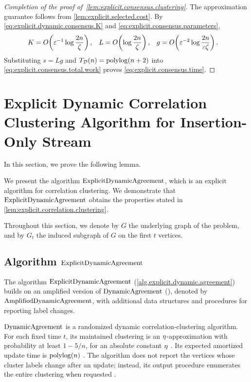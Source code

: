 \begin{proof}[Completion of the proof of~\cref{lem:explicit.consensus.clustering}]
The approximation guarantee follows from \cref{lem:explicit.selected.cost}.
By \eqref{eq:explicit.dynamic.consensus.K} and \eqref{eq:explicit.consensus.parameters},
\begin{align}
    K&=O\!\left(\varepsilon^{-1}\log\frac{2n}{\zeta}\right),
    &L&=O\!\left(\log\frac{2n}{\zeta}\right),
    &g&=O\!\left(\varepsilon^{-2}\log\frac{2n}{\varepsilon\zeta}\right).
    \nonumber
\end{align}
Substituting $ s=Lg $ and $ T_{\mathcal D}(n)=\operatorname{polylog}(n+2) $ into \eqref{eq:explicit.consensus.total.work} proves \eqref{eq:explicit.consensus.time}.
\end{proof}

\section{Explicit Dynamic Correlation Clustering Algorithm for Insertion-Only Stream}\label{sec:explicit_dynamic_correlation_clustering_algorithm_for_insertion_only_stream} %

In this section, we prove the following lemma.
\ExplicitDA*

We present the algorithm $ \mathrm{ExplicitDynamicAgreement} $, which is an explicit algorithm for correlation clustering.
We demonstrate that $ \mathrm{ExplicitDynamicAgreement} $ obtains the properties stated in \cref{lem:explicit.correlation.clustering}.

Throughout this section, we denote by $ G $ the underlying graph of the problem, and by $ G_{t} $ the induced subgraph of $ G $ on the first $ t $ vertices.
\subsection{Algorithm \texorpdfstring{$ \mathrm{ExplicitDynamicAgreement} $}{ExplicitDA}}\label{sub:algorithm.explictDA} %
The algorithm $ \mathrm{ExplicitDynamicAgreement} $ (\cref{alg.explicit.dynamic.agreement}) builds on an amplified version of $ \mathrm{DynamicAgreement} $ (\cite{CLMP2024Dynamic}), denoted by $ \mathrm{AmplifiedDynamicAgreement} $, with additional data structures and procedures for reporting label changes.

$ \mathrm{DynamicAgreement} $ is a randomized dynamic correlation-clustering algorithm.
For each fixed time $ t $, its maintained clustering is an $ \eta $-approximation with probability at least $ 1-5/n $, for an absolute constant $ \eta $ \cite[Theorem~6]{CLMP2024Dynamic}.
Its expected amortized update time is $ \operatorname{polylog}(n) $ \cite[Appendix~C, proof of Theorem~41]{CLMP2024Dynamic}.
The algorithm does not report the vertices whose cluster labels change after an update; instead, its output procedure enumerates the entire clustering when requested \cite[Appendix~D]{CLMP2024Dynamic}.

